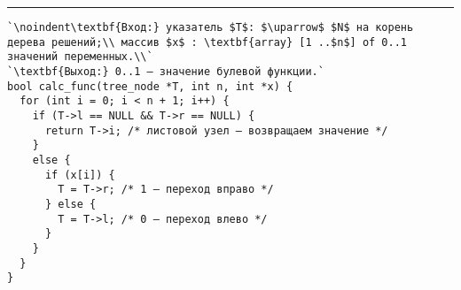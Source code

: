 \documentclass{article}
\begin{document}
\vspace{5pt} \hrule

\begin{lstlisting}[caption={Вычисление сокращённого дерева решений}, label=p138_calc_function, escapechar=`]
`\noindent\textbf{Вход:} указатель $T$: $\uparrow$ $N$ на корень дерева решений;\\ массив $x$ : \textbf{array} [1 ..$n$] of 0..1 значений переменных.\\`
`\textbf{Выход:} 0..1 — значение булевой функции.`
bool calc_func(tree_node *T, int n, int *x) {
  for (int i = 0; i < n + 1; i++) {
    if (T->l == NULL && T->r == NULL) {
      return T->i; /* листовой узел — возвращаем значениe */
    }
    else {
      if (x[i]) {
        T = T->r; /* 1 — переход вправо */
      } else {
        T = T->l; /* 0 — переход влево */
      }
    }
  }
}
\end{lstlisting}
\end{document}
